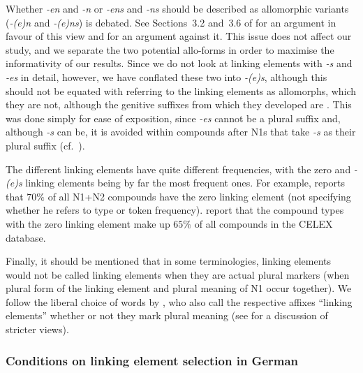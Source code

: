 Whether \textit{-en} and \textit{-n} or \textit{-ens} and \textit{-ns} should be described as allomorphic variants (\ie \textit{-(e)n} and \textit{-(e)ns}) is debated.
See Sections~3.2 and~3.6 of \textcite{NueblingSzczepaniak2013} for an argument in favour of this view and \textcite[33--36]{Neef2015} for an argument against it.
This issue does not affect our study, and we separate the two potential allo-forms in order to maximise the informativity of our results.
Since we do not look at linking elements with \textit{-s} and \textit{-es} in detail, however, we have conflated these two into \textit{-(e)s}, although this should not be equated with referring to the linking elements as allomorphs, which they are not, although the genitive suffixes from which they developed are \parencite[81]{Szczepaniak2016,NueblingSzczepaniak2013}.
This was done simply for ease of exposition, since \textit{-es} cannot be a plural suffix and, although \textit{-s} can be, it is avoided within compounds after N1s that take \textit{-s} as their plural suffix (cf.\ \citealt{Wegener2003,Wegener2005,NueblingSzczepaniak2013}).

The different linking elements have quite different frequencies, with the zero and \textit{-(e)s} linking elements being by far the most frequent ones.
For example, \textcite[177]{Gallmann1998} reports that $70\%$ of all N1+N2 compounds have the zero linking element (not specifying whether he refers to type or token frequency).
\textcite[29]{KrottEa2007} report that the compound types with the zero linking element make up $65\%$ of all compounds in the CELEX database.

Finally, it should be mentioned that in some terminologies, linking elements would not be called linking elements when they are actual plural markers (\ie when plural form of the linking element and plural meaning of N1 occur together).
We follow the liberal choice of words by \textcite{BangaEa2013b}, who also call the respective affixes ``linking elements'' whether or not they mark plural meaning (see \citealt[196]{BangaEa2013b} for a discussion of stricter views).

\subsubsection{Conditions on linking element selection in German}
\label{sec:conditionsonlinkageselectioningerman}

